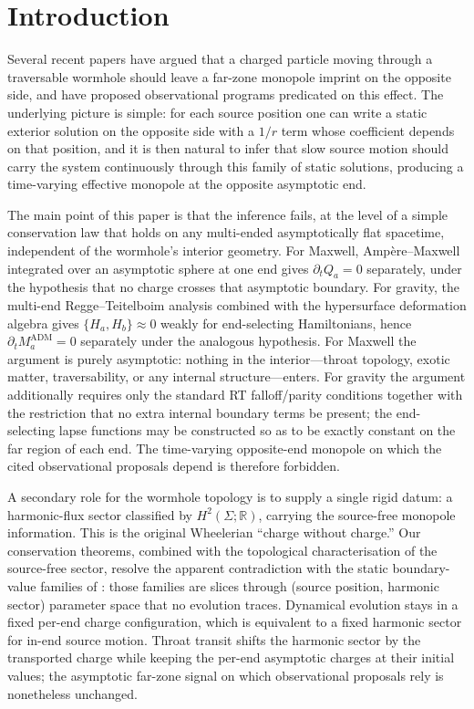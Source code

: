 \documentclass[aps,prd,onecolumn,nofootinbib,superscriptaddress]{revtex4-2}
\begin{document}
\section{Introduction}
\label{sec:intro}

Several recent papers have argued that a charged particle moving through a traversable wormhole should leave a far-zone monopole imprint on the opposite side, and have proposed observational programs predicated on this effect.\cite{DaiStojkovic2019Observing,DaiStojkovic2020ReplyObserving,SimonettiEtAl2021SensitiveSearches,BaoHouZhang2023GWScattering,BambiStojkovic2021AstrophysicalWormholes} The underlying picture is simple: for each source position one can write a static exterior solution on the opposite side with a $1/r$ term whose coefficient depends on that position, and it is then natural to infer that slow source motion should carry the system continuously through this family of static solutions, producing a time-varying effective monopole at the opposite asymptotic end.

The main point of this paper is that the inference fails, at the level of a simple conservation law that holds on any multi-ended asymptotically flat spacetime, independent of the wormhole's interior geometry. For Maxwell, Amp\`ere--Maxwell integrated over an asymptotic sphere at one end gives $\partial_t Q_a = 0$ separately, under the hypothesis that no charge crosses that asymptotic boundary. For gravity, the multi-end Regge--Teitelboim analysis combined with the hypersurface deformation algebra gives $\{H_a, H_b\} \approx 0$ weakly for end-selecting Hamiltonians, hence $\partial_t M_a^{\mathrm{ADM}} = 0$ separately under the analogous hypothesis. For Maxwell the argument is purely asymptotic: nothing in the interior---throat topology, exotic matter, traversability, or any internal structure---enters. For gravity the argument additionally requires only the standard RT falloff/parity conditions together with the restriction that no extra internal boundary terms be present; the end-selecting lapse functions may be constructed so as to be exactly constant on the far region of each end. The time-varying opposite-end monopole on which the cited observational proposals depend is therefore forbidden.

A secondary role for the wormhole topology is to supply a single rigid datum: a harmonic-flux sector classified by $H^2(\Sigma;\mathbb{R})$, carrying the source-free monopole information.\cite{MisnerWheeler1957ClassicalPhysics,Wheeler1962Geometrodynamics} This is the original Wheelerian ``charge without charge.'' Our conservation theorems, combined with the topological characterisation of the source-free sector, resolve the apparent contradiction with the static boundary-value families of \cite{DaiStojkovic2019Observing}: those families are slices through (source position, harmonic sector) parameter space that no evolution traces. Dynamical evolution stays in a fixed per-end charge configuration, which is equivalent to a fixed harmonic sector for in-end source motion. Throat transit shifts the harmonic sector by the transported charge while keeping the per-end asymptotic charges at their initial values; the asymptotic far-zone signal on which observational proposals rely is nonetheless unchanged.
\end{document}
